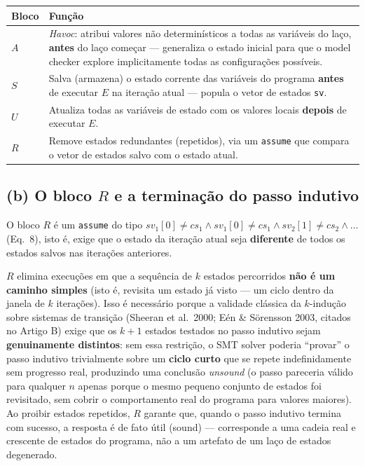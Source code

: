 \documentclass[12pt,a4paper]{article}
\newcommand{\vv}[1]{\texttt{#1}}
\begin{document}
\begin{center}
\begin{tabular}{@{}p{1.3cm}p{12.8cm}@{}}
\toprule
Bloco & Função \\
\midrule
$A$ & \emph{Havoc}: atribui valores n\~ao determin\'isticos a todas as vari\'aveis do la\c{c}o, \textbf{antes} do la\c{c}o começar --- generaliza o estado inicial para que o model checker explore implicitamente todas as configura\c{c}\~oes poss\'iveis. \\
$S$ & Salva (armazena) o estado corrente das vari\'aveis do programa \textbf{antes} de executar $E$ na itera\c{c}\~ao atual --- popula o vetor de estados \vv{sv}. \\
$U$ & Atualiza todas as vari\'aveis de estado com os valores locais \textbf{depois} de executar $E$. \\
$R$ & Remove estados redundantes (repetidos), via um \vv{assume} que compara o vetor de estados salvo com o estado atual. \\
\bottomrule
\end{tabular}
\end{center}

\subsection{(b) O bloco $R$ e a terminação do passo indutivo}

O bloco $R$ \'e um \vv{assume} do tipo $sv_1[0]\neq cs_1 \wedge sv_1[0]\neq cs_1\wedge
sv_2[1]\neq cs_2 \wedge \ldots$ (Eq.~8), isto \'e, exige que o estado da itera\c{c}\~ao atual
seja \textbf{diferente} de todos os estados salvos nas itera\c{c}\~oes anteriores.

\begin{tcolorbox}[notabox]
$R$ elimina execu\c{c}\~oes em que a sequ\^encia de $k$ estados percorridos \textbf{n\~ao \'e
um caminho simples} (isto \'e, revisita um estado j\'a visto --- um ciclo dentro da janela de
$k$ itera\c{c}\~oes). Isso \'e necess\'ario porque a validade cl\'assica da $k$-indu\c{c}\~ao
sobre sistemas de transi\c{c}\~ao (Sheeran et al.\ 2000; E\'en \& S\"orensson 2003, citados no
Artigo B) exige que os $k{+}1$ estados testados no passo indutivo sejam
\textbf{genuinamente distintos}: sem essa restri\c{c}\~ao, o SMT solver poderia ``provar'' o
passo indutivo trivialmente sobre um \textbf{ciclo curto} que se repete indefinidamente sem
progresso real, produzindo uma conclus\~ao \emph{unsound} (o passo pareceria v\'alido para
qualquer $n$ apenas porque o mesmo pequeno conjunto de estados foi revisitado, sem cobrir o
comportamento real do programa para valores maiores). Ao proibir estados repetidos, $R$
garante que, quando o passo indutivo termina com sucesso, a resposta \'e de fato \'util
(sound) --- corresponde a uma cadeia real e crescente de estados do programa, n\~ao a um
artefato de um la\c{c}o de estados degenerado.
\end{tcolorbox}
\end{document}
